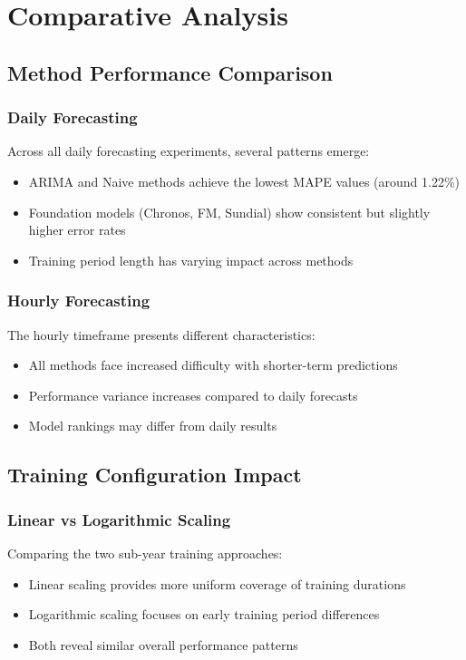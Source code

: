 \documentclass{article}
\begin{document}


\section{Comparative Analysis}

\subsection{Method Performance Comparison}

\subsubsection{Daily Forecasting}
Across all daily forecasting experiments, several patterns emerge:
\begin{itemize}
\item ARIMA and Naive methods achieve the lowest MAPE values (around 1.22\%)
\item Foundation models (Chronos, FM, Sundial) show consistent but slightly higher error rates
\item Training period length has varying impact across methods
\end{itemize}

\subsubsection{Hourly Forecasting}
The hourly timeframe presents different characteristics:
\begin{itemize}
\item All methods face increased difficulty with shorter-term predictions
\item Performance variance increases compared to daily forecasts
\item Model rankings may differ from daily results
\end{itemize}

\subsection{Training Configuration Impact}

\subsubsection{Linear vs Logarithmic Scaling}
Comparing the two sub-year training approaches:
\begin{itemize}
\item Linear scaling provides more uniform coverage of training durations
\item Logarithmic scaling focuses on early training period differences
\item Both reveal similar overall performance patterns
\end{itemize}
\end{document}
